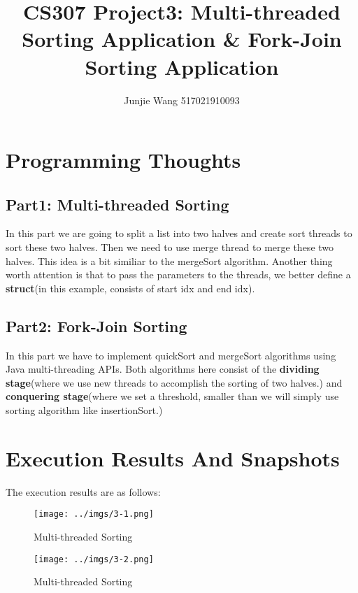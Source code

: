 \documentclass[12pt]{extarticle}
\title{CS307 Project3: Multi-threaded Sorting Application \& Fork-Join Sorting Application}
\author{Junjie Wang 517021910093}
\newcommand{\<}{\langle}
\renewcommand{\>}{\rangle}
\theoremstyle{definition}
\begin{document}
	\maketitle 
	\section{Programming Thoughts}
	\subsection{Part1: Multi-threaded Sorting}
	In this part we are going to split a list into two halves and create sort threads to sort these two halves. Then we need to use merge thread to merge these two halves. This idea is a bit similiar to the mergeSort algorithm. Another thing worth attention is that to pass the parameters to the threads, we better define a \textbf{struct}(in this example, consists of start idx and end idx).
	\subsection{Part2: Fork-Join Sorting}
	In this part we have to implement quickSort and mergeSort algorithms using Java multi-threading APIs. Both algorithms here consist of the \textbf{dividing stage}(where we use new threads to accomplish the sorting of two halves.) and \textbf{conquering stage}(where we set a threshold, smaller than we will simply use sorting algorithm like insertionSort.)
	\section{Execution Results And Snapshots}
	The execution results are as follows:
	\begin{figure}[H]
	\centering 
	\texttt{[image: ../imgs/3-1.png]}
	\caption{Multi-threaded Sorting}
	\end{figure} 
	\begin{figure}[H]
	\centering 
	\texttt{[image: ../imgs/3-2.png]}
	\caption{Multi-threaded Sorting}
	\end{figure} 
\end{document}
